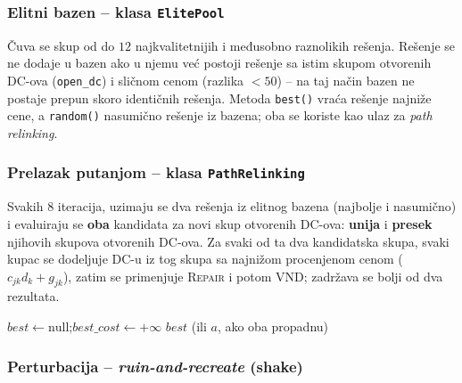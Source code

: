 \documentclass[12pt,a4paper]{article}
\begin{document}
\subsubsection{Elitni bazen -- klasa \texttt{ElitePool}}

Čuva se skup od do $12$ najkvalitetnijih i međusobno raznolikih rešenja.
Rešenje se ne dodaje u bazen ako u njemu već postoji rešenje sa istim
skupom otvorenih DC-ova (\texttt{open\_dc}) i sličnom cenom (razlika
$< 50$) -- na taj način bazen ne postaje prepun skoro identičnih rešenja.
Metoda \texttt{best()} vraća rešenje najniže cene, a \texttt{random()}
nasumično rešenje iz bazena; oba se koriste kao ulaz za \textit{path relinking}.

\subsubsection{Prelazak putanjom -- klasa \texttt{PathRelinking}}

Svakih $8$ iteracija, uzimaju se dva rešenja iz elitnog bazena (najbolje
i nasumično) i evaluiraju se \textbf{oba} kandidata za novi skup otvorenih
DC-ova: \textbf{unija} i \textbf{presek} njihovih skupova otvorenih DC-ova.
Za svaki od ta dva kandidatska skupa, svaki kupac se dodeljuje DC-u iz tog
skupa sa najnižom procenjenom cenom ($c_{jk}d_k + g_{jk}$), zatim se
primenjuje \textsc{Repair} i potom VND; zadržava se bolji od dva rezultata.

\begin{algorithm}[H]
\caption{PathRelinking$(a, b, D)$}
\SetAlgoLined
$best \leftarrow \text{null}$;\quad $best\_cost \leftarrow +\infty$\;
\Return $best$ (ili $a$, ako oba propadnu)
\end{algorithm}

\subsubsection{Perturbacija -- \textit{ruin-and-recreate} (shake)}
\end{document}
